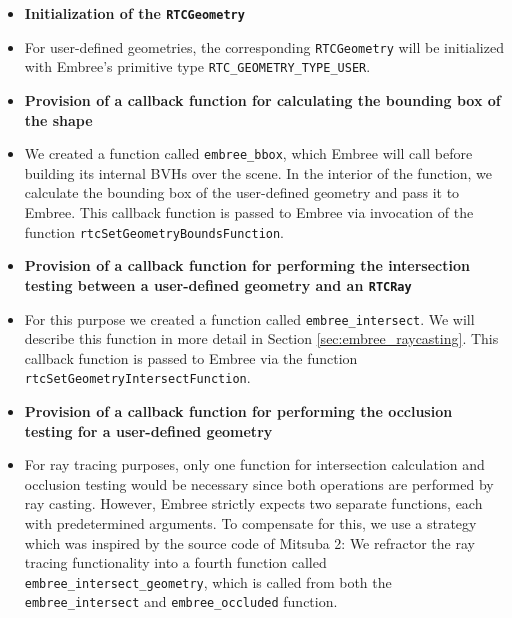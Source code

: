 \begin{itemize}
	\setlength\itemsep{0.05em}
	
	\item \textbf{Initialization of the \texttt{RTCGeometry}}
	\item[] For user-defined geometries, the corresponding \texttt{RTCGeometry} will be initialized with Embree's primitive type \texttt{RTC\_GEOMETRY\_TYPE\_USER}.
	\\
	
	\item \textbf{Provision of a callback function for calculating the bounding box of the shape}
	\item[] We created a function called \texttt{embree\_bbox}, which Embree will call before building its internal BVHs over the scene. In the interior of the function, we calculate the bounding box of the user-defined geometry and pass it to Embree. This callback function is passed to Embree via invocation of the function \texttt{rtcSetGeometryBoundsFunction}.
	\\
	
	\item \textbf{Provision of a callback function for performing the intersection testing between a user-defined geometry and an \texttt{RTCRay}}
	\item[] For this purpose we created a function called \texttt{embree\_intersect}. We will describe this function in more detail in Section \ref{sec:embree_raycasting}. This callback function is passed to Embree via the function \texttt{rtcSetGeometryIntersectFunction}.
	\\
	
	\item \textbf{Provision of a callback function for performing the occlusion testing for a user-defined geometry}
	\item[] For ray tracing purposes, only one function for intersection calculation and occlusion testing would be necessary since both operations are performed by ray casting. However, Embree strictly expects two separate functions, each with predetermined arguments. To compensate for this, we use a strategy which was inspired by the source code of Mitsuba 2: We refractor the ray tracing functionality into a fourth function called \texttt{embree\_intersect\_geometry}, which is called from both the \texttt{embree\_intersect} and \texttt{embree\_occluded} function. 
	
\end{itemize}

